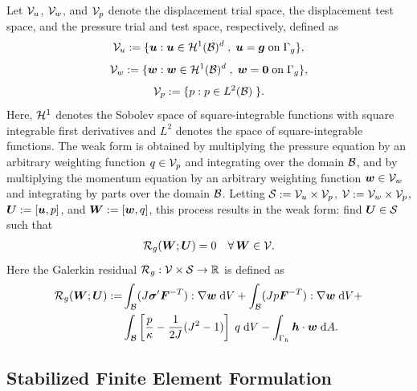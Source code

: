 Let $\mathcal{V}_u$, $\mathcal{V}_w$, and $\mathcal{V}_p$ denote the displacement trial space,
the displacement test space, and the pressure trial and test space,
respectively, defined as
%
\begin{gather}
\mathcal{V}_u := \{ \boldsymbol{u} : \boldsymbol{u} \in \mathcal{H}^1(\mathcal{B})^d \; , \;
\boldsymbol{u} = \boldsymbol{g} \; \text{on} \; \Gamma_g \},
\label{eq:mech_disp_space_continuous}
\end{gather}
%
\begin{gather}
\mathcal{V}_w := \{ \boldsymbol{w} : \boldsymbol{w} \in \mathcal{H}^1(\mathcal{B})^d \; , \;
\boldsymbol{w} = \boldsymbol{0} \; \text{on} \; \Gamma_g \},
\label{eq:mech_weight_space_continuous}
\end{gather}
%
\begin{gather}
\mathcal{V}_p := \{ p : p \in L^2(\mathcal{B}) \; \}.
\label{eq:mech_pressure_space_continuous}
\end{gather}
%
Here, $\mathcal{H}^1$ denotes the Sobolev space of square-integrable functions
with square integrable first derivatives and $L^2$ denotes the space
of square-integrable functions. The weak form is obtained by multiplying
the pressure equation by an arbitrary weighting function $q \in \mathcal{V}_p$
and integrating over the domain $\mathcal{B}$, and by multiplying the momentum
equation by an arbitrary weighting function $\boldsymbol{w} \in \mathcal{V}_w$ and integrating
by parts over the domain $\mathcal{B}$. Letting $\mathcal{S} := \mathcal{V}_u \times \mathcal{V}_p$,
$\mathcal{V} := \mathcal{V}_w \times \mathcal{V}_p$, $\boldsymbol{U} := [\boldsymbol{u}, p]$, and $\boldsymbol{W} := [\boldsymbol{w}, q]$,
this process results in the weak form: find $\boldsymbol{U} \in \mathcal{S}$ such that
%
\begin{gather}
\mathcal{R}_g(\boldsymbol{W} ; \boldsymbol{U}) = 0 \quad \forall \, \boldsymbol{W} \in \mathcal{V}.
\label{eq:mech_weak_form}
\end{gather}
%
Here the Galerkin residual $\mathcal{R}_g : \mathcal{V} \times \mathcal{S} \to \mathbb{R}$ is
defined as
%
\begin{gather}
\begin{split}
\mathcal{R}_g(\boldsymbol{W} ; \boldsymbol{U}) :=
&\int_{\mathcal{B}} (J \boldsymbol{\sigma}' \boldsymbol{F}^{-T}) : \nabla \boldsymbol{w} \; \text{d} V
+ \int_{\mathcal{B}} (J p \boldsymbol{F}^{-T}) : \nabla \boldsymbol{w} \; \text{d} V + \\
& \int_{\mathcal{B}} \left[ \frac{p}{\kappa} - \frac{1}{2 J}(J^2 - 1) \right] \;
q \; \text{d} V
- \int_{\Gamma_h} \boldsymbol{h} \cdot \boldsymbol{w} \; \text{d} A.
\end{split}
\label{eq:mech_galerkin_resid}
\end{gather}

\subsection{Stabilized Finite Element Formulation}

